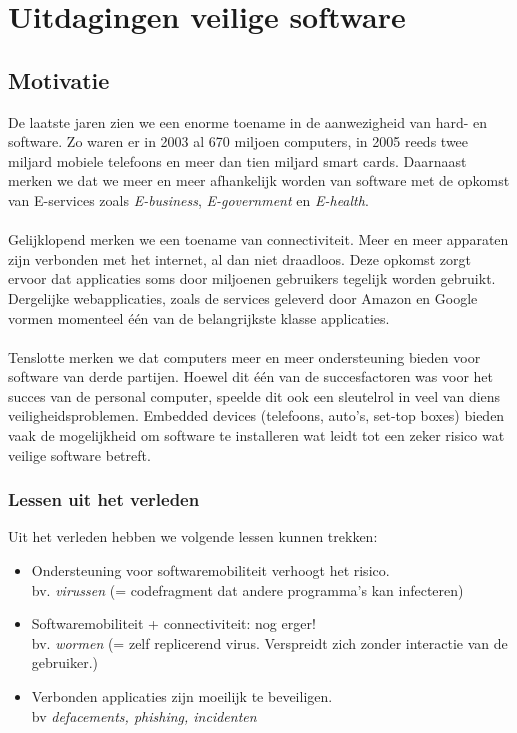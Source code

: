 \documentclass[../main.tex]{subfiles}
\begin{document}
\chapter{Uitdagingen veilige software}

\section{Motivatie}
De laatste jaren zien we een enorme toename in de aanwezigheid van hard- en software. Zo waren er in 2003 al 670 miljoen computers, in 2005 reeds twee miljard mobiele telefoons en meer dan tien miljard smart cards. Daarnaast merken we dat we meer en meer afhankelijk worden van software met de opkomst van E-services zoals \textit{E-business}, \textit{E-government} en \textit{E-health}.
\\\\
Gelijklopend merken we een toename van connectiviteit. Meer en meer apparaten zijn verbonden met het internet, al dan niet draadloos. Deze opkomst zorgt ervoor dat applicaties soms door miljoenen gebruikers tegelijk worden gebruikt. Dergelijke webapplicaties, zoals de services geleverd door Amazon en Google vormen momenteel \'e\'en van de belangrijkste klasse applicaties.
\\\\
Tenslotte merken we dat computers meer en meer ondersteuning bieden voor software van derde partijen. Hoewel dit \'e\'en van de succesfactoren was voor het succes van de personal computer, speelde dit ook een sleutelrol in veel van diens veiligheidsproblemen. Embedded devices (telefoons, auto's, set-top boxes) bieden vaak de mogelijkheid om software te installeren wat leidt tot een zeker risico wat veilige software betreft.

\subsection{Lessen uit het verleden}
Uit het verleden hebben we volgende lessen kunnen trekken:
\begin{itemize}
	\item Ondersteuning voor softwaremobiliteit verhoogt het risico. \\ bv. \textit{virussen} (= codefragment dat andere programma's kan infecteren)
	\item Softwaremobiliteit + connectiviteit: nog erger! \\ bv. \textit{wormen} (= zelf replicerend virus. Verspreidt zich zonder interactie van de gebruiker.)
	\item Verbonden applicaties zijn moeilijk te beveiligen. \\ bv \textit{defacements, phishing, incidenten}
\end{itemize}
\end{document}
